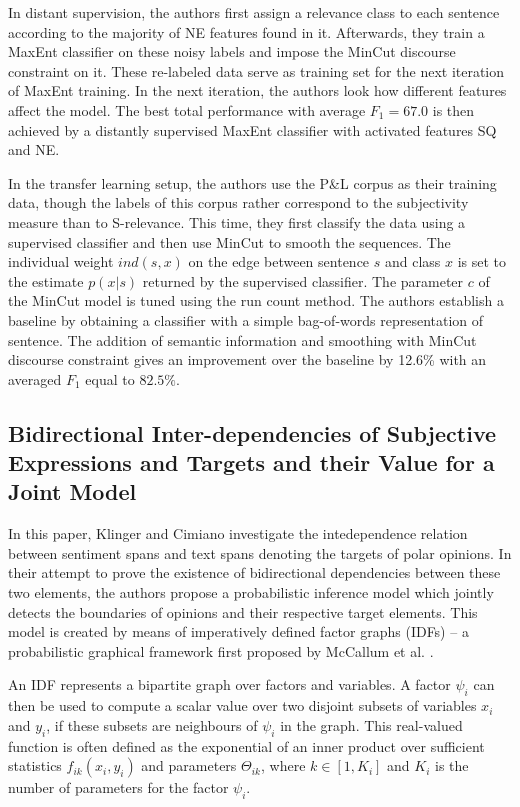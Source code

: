 \documentclass[a4paper,11pt]{article}
\begin{document}
In distant supervision, the authors first assign a relevance class to
each sentence according to the majority of NE features found in it.
Afterwards, they train a MaxEnt classifier on these noisy labels and
impose the MinCut discourse constraint on it.  These re-labeled data
serve as training set for the next iteration of MaxEnt training.  In
the next iteration, the authors look how different features affect the
model.  The best total performance with average $F_1 = 67.0$ is then
achieved by a distantly supervised MaxEnt classifier with activated
features SQ and NE.

In the transfer learning setup, the authors use the P\&L corpus as
their training data, though the labels of this corpus rather
correspond to the subjectivity measure than to S-relevance.  This
time, they first classify the data using a supervised classifier and
then use MinCut to smooth the sequences.  The individual weight
$ind(s,x)$ on the edge between sentence $s$ and class $x$ is set to
the estimate $p(x|s)$ returned by the supervised classifier.  The
parameter $c$ of the MinCut model is tuned using the run count method.
The authors establish a baseline by obtaining a classifier with a
simple bag-of-words representation of sentence.  The addition of
semantic information and smoothing with MinCut discourse constraint
gives an improvement over the baseline by 12.6\% with an averaged
$F_1$ equal to $82.5\%$.

\subsection{Bidirectional Inter-dependencies of Subjective Expressions and
                  Targets and their Value for a Joint Model \cite{Klinger-13}}

In this paper, Klinger and Cimiano investigate the intedependence relation
between sentiment spans and text spans denoting the targets of polar opinions.
In their attempt to prove the existence of bidirectional dependencies between
these two elements, the authors propose a probabilistic inference model which
jointly detects the boundaries of opinions and their respective target
elements.  This model is created by means of imperatively defined factor
graphs (IDFs) -- a probabilistic graphical framework first proposed by
McCallum et al. \cite{McCallum-09}.

An IDF represents a bipartite graph over factors and variables.  A factor
$\psi_i$ can then be used to compute a scalar value over two disjoint subsets
of variables $x_i$ and $y_i$, if these subsets are neighbours of $\psi_i$ in
the graph.  This real-valued function is often defined as the exponential of
an inner product over sufficient statistics ${f_{ik}(x_i, y_i)}$ and
parameters ${\Theta_{ik}}$, where $k \in [1, K_i]$ and $K_i$ is the number of
parameters for the factor $\psi_i$.
\end{document}
